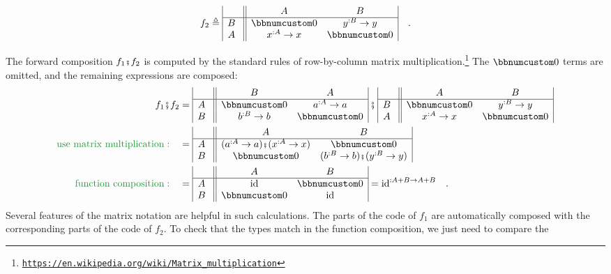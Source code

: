 \vspace{-1.5\baselineskip}
\[
f_{2}\triangleq\begin{array}{|c||cc|}
 & A & B\\
\hline B~ & \bbnum 0 & y^{:B}\rightarrow y\\
A~ & x^{:A}\rightarrow x & \bbnum 0
\end{array}\quad.
\]
\vspace{-0.8\baselineskip}

\noindent The forward composition $f_{1}\bef f_{2}$ is computed by
the standard rules of row-by-column matrix multiplication.\footnote{\texttt{\href{https://en.wikipedia.org/wiki/Matrix_multiplication}{https://en.wikipedia.org/wiki/Matrix\_multiplication}}}
The $\bbnum 0$ terms are omitted, and the remaining expressions are
composed:
\begin{align*}
f_{1}\bef f_{2} & =\begin{array}{|c||cc|}
 & B & A\\
\hline A~ & \bbnum 0 & a^{:A}\rightarrow a\\
B~ & b^{:B}\rightarrow b & \bbnum 0
\end{array}\,\bef\,\begin{array}{|c||cc|}
 & A & B\\
\hline B~ & \bbnum 0 & y^{:B}\rightarrow y\\
A~ & x^{:A}\rightarrow x & \bbnum 0
\end{array}\\
{\color{greenunder}\text{use matrix multiplication}:}\quad & =\begin{array}{|c||cc|}
 & A & B\\
\hline A~ & (a^{:A}\rightarrow a)\bef(x^{:A}\rightarrow x) & \bbnum 0\\
B~ & \bbnum 0 & (b^{:B}\rightarrow b)\bef(y^{:B}\rightarrow y)
\end{array}\\
{\color{greenunder}\text{function composition}:}\quad & =\begin{array}{|c||cc|}
 & A & B\\
\hline A~ & \text{id} & \bbnum 0\\
B~ & \bbnum 0 & \text{id}
\end{array}=\text{id}^{:A+B\rightarrow A+B}\quad.
\end{align*}
Several features of the matrix notation are helpful in such calculations.
The parts of the code of $f_{1}$ are automatically composed with
the corresponding parts of the code of $f_{2}$. To check that the
types match in the function composition, we just need to compare the
